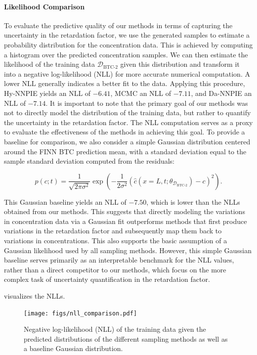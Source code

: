\paragraph{Likelihood Comparison}
\label{sec:likelihood}
To evaluate the predictive quality of our methods in terms of capturing the uncertainty in the retardation factor, we use the generated samples to estimate a probability distribution for the concentration data. This is achieved by computing a histogram over the predicted concentration samples. We can then estimate the likelihood of the training data $\mathcal{D}_{\text{BTC-2}}$ given this distribution and transform it into a negative log-likelihood (NLL) for more accurate numerical computation. A lower NLL generally indicates a better fit to the data. Applying this procedure, Hy-NNPIE yields an NLL of $-6.41$, MCMC an NLL of $-7.11$, and Da-NNPIE an NLL of $-7.14$. It is important to note that the primary goal of our methods was not to directly model the distribution of the training data, but rather to quantify the uncertainty in the retardation factor. The NLL computation serves as a proxy to evaluate the effectiveness of the methods in achieving this goal. To provide a baseline for comparison, we also consider a simple Gaussian distribution centered around the FINN BTC prediction mean, with a standard deviation equal to the sample standard deviation computed from the residuals:

\begin{equation*}
    p(c; t) = \frac{1}{\sqrt{2 \pi \sigma^2}} \exp(-\frac{1}{2 \sigma^2} (\hat{c}(x=L, t;\theta_{\mathcal{D}_{\text{BTC-2}}}) - c)^2) .
\end{equation*}

This Gaussian baseline yields an NLL of $-7.50$, which is lower than the NLLs obtained from our methods. This suggests that directly modeling the variations in concentration data via a Gaussian fit outperforms methods that first produce variations in the retardation factor and subsequently map them back to variations in concentrations. This also supports the basic assumption of a Gaussian likelihood used by all sampling methods. However, this simple Gaussian baseline serves primarily as an interpretable benchmark for the NLL values, rather than a direct competitor to our methods, which focus on the more complex task of uncertainty quantification in the retardation factor.


 visualizes the NLLs.

\begin{figure}[h]
    \centering
    \texttt{[image: figs/nll\_comparison.pdf]}
    \caption{Negative log-likelihood (NLL) of the training data given the predicted distributions of the different sampling methods as well as a baseline Gaussian distribution.}
    \label{fig:nll_comparison}
\end{figure}



